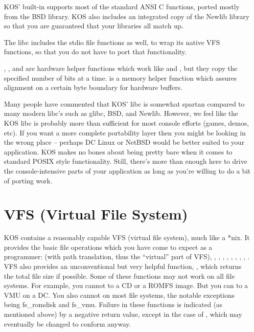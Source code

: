\documentclass[english]{report}
\begin{document}
KOS' built-in  supports most of the standard ANSI C functions,
ported mostly from the BSD library. KOS also includes an integrated
copy of the Newlib  library so that you are guaranteed
that your libraries all match up.

The libc includes the stdio file functions as well, to wrap its native
VFS functions, so that you do not have to port that functionality.

, ,  and 
are hardware helper functions which work like  and
, but they copy the specified number of bits at a time.
 is a memory helper function which assures alignment
on a certain byte boundary for hardware buffers.

Many people have commented that KOS' libc is somewhat spartan compared
to many modern libc's such as glibc, BSD, and Newlib. However, we
feel like the KOS libc is probably more than sufficient for most console
efforts (games, demos, etc). If you want a more complete portability
layer then you might be looking in the wrong place -- perhaps DC Linux
or NetBSD would be better suited to your application. KOS makes no
bones about being pretty bare when it comes to standard POSIX style
functionality. Still, there's more than enough here to drive the console-intensive
parts of your application as long as you're willing to do a bit of
porting work.


\section{VFS (Virtual File System)}

KOS contains a reasonably capable VFS (virtual file system), much
like a *nix. It provides the basic file operations which you have
come to expect as a programmer:  (with path translation,
thus the {}``virtual'' part of VFS), , ,
, , , , ,
, . VFS also provides an unconventional
but very helpful function, , which returns the total
file size if possible. Some of these functions may not work on all
file systems. For example, you cannot  to a CD or a
ROMFS image. But you can  to a VMU on a DC. You also
cannot  on most file systems, the notable exceptions
being fs\_romdisk and fs\_vmu. Failure in these functions is indicated
(as mentioned above) by a negative return value, except in the case
of , which may eventually be changed to conform anyway.
\end{document}
